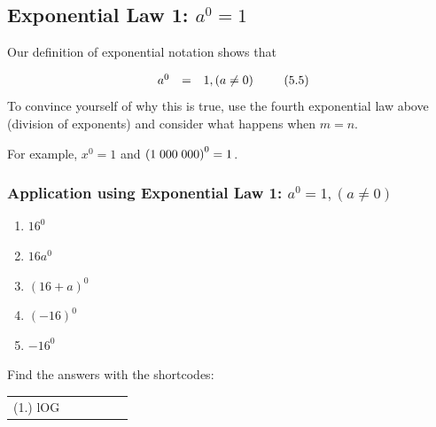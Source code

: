             \subsection{ Exponential Law 1: ${a}^{0}=1$}
            \nopagebreak
        \label{m38359*id63512}Our definition of exponential notation shows that\par 
        \label{m38359*uid5}\nopagebreak\noindent{}
          
    \begin{equation}
    \begin{array}{ccc}\hfill {a}^{0}& =& 1,\left(a\ne 0\right)\hfill \end{array}\tag{5.5}
      \end{equation}
        \label{m38359*eip-662}To convince yourself of why this is true, use the fourth exponential law above (division of exponents) and consider what happens when $m=n$.\par \label{m38359*id63571}For example, ${x}^{0}=1$ and ${\left(1\phantom{\rule{0.277778em}{0ex}}000\phantom{\rule{0.277778em}{0ex}}000\right)}^{0}=1$.\par 
\label{m38359*secfhsst!!!underscore!!!id339}
            \subsubsection{  Application using Exponential Law 1: ${a}^{0}=1,\left(a\ne 0\right)$ }
            \nopagebreak
        \label{m38359*id63666}\begin{enumerate}[noitemsep, label=\textbf{\arabic*}. ] 
            \label{m38359*uid6}\item 
            ${16}^{0}$
      \label{m38359*uid7}\item 
        $16{a}^{0}$
      \label{m38359*uid8}\item 
        ${\left(16+a\right)}^{0}$
      \label{m38359*uid9}\item 
        ${\left(-16\right)}^{0}$
      \label{m38359*uid10}\item 
        $-{16}^{0}$ 
\newline
\newline
          \end{enumerate}
      \label{m38359*uid11}
\par {} Find the answers with the shortcodes:
 \par \begin{tabular}[h]{cccccc}
 (1.) lOG  & \end{tabular}
